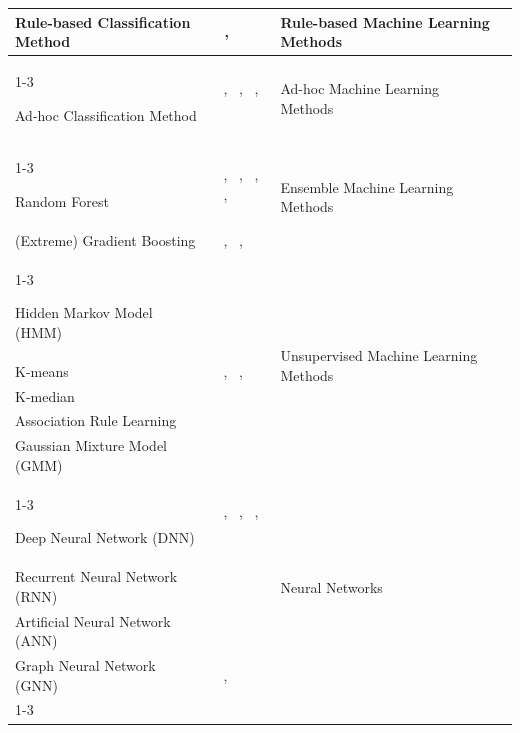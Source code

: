 \documentclass{sfuthesis}
\begin{document}
\begin{appendices}
\begin{landscape}
\begin{longtable}{
p{5.5cm}
p{4cm}
p{6cm}
p{3.5cm}
}
Rule-based Classification Method &
~\cite{Monti2025RailwayBridgeDSS}, ~\cite{Tarnowska2022TinnitusTherapy} &
Rule-based Machine Learning Methods &
\\
\cline{1-3}

Ad-hoc Classification Method &
~\cite{Zhu2018EducationalDSS}, ~\cite{Tarnowska2022TinnitusTherapy}, ~\cite{leem2023towards}, ~\cite{valdes2017clinical} &
Ad-hoc Machine Learning Methods &
\\
\cline{1-3}

Random Forest &
~\cite{Deng2017ScoliosisDSS}, ~\cite{ataei2024intelligent}, ~\cite{verboven2022treatment}, ~\cite{lee2024machine}, ~\cite{Tarnowska2022TinnitusTherapy} &
\multirow{2}{6cm}{Ensemble Machine Learning Methods} &
\\

(Extreme) Gradient Boosting &
~\cite{Kozielski2021LPGDSS}, ~\cite{makokha2025enhancing}, ~\cite{feng2024adaptive} &
&
\\
\cline{1-3}

Hidden Markov Model (HMM) &
~\cite{song2024building} &
\multirow{5}{6cm}{Unsupervised Machine Learning Methods} &
\\

K-means &
~\cite{Pahuja2024Dexter}, ~\cite{Milic2024DataCenterEnergy}, ~\cite{leem2023towards} &
&
\\

K-median &
~\cite{feng2024adaptive} &
&
\\

Association Rule Learning &
~\cite{Tarnowska2022TinnitusTherapy} &
&
\\

Gaussian Mixture Model (GMM) &
~\cite{cecconi2022data} &
&
\\
\cline{1-3}

Deep Neural Network (DNN) &
~\cite{Han2020WastewaterDecisionMaking}, ~\cite{miao2025research}, ~\cite{wang2023data}, ~\cite{kharazmi2018computer} &
\multirow{4}{6cm}{Neural Networks} &
\\

Recurrent Neural Network (RNN) &
~\cite{kim2025development} &
&
\\

Artificial Neural Network (ANN) &
~\cite{Chen2023TyphoonVolunteers} &
&
\\

Graph Neural Network (GNN) &
~\cite{li2024optimal}, ~\cite{price2025aura} &
&
\\
\cline{1-3}


\end{longtable}
\end{landscape}
\end{appendices}
\end{document}
